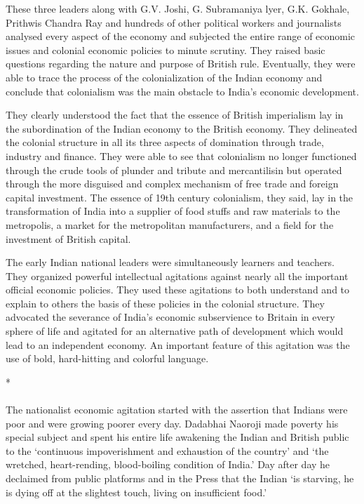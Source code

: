 \begin{multicols}{2}
These three leaders along with G.V. Joshi, G. Subramaniya lyer, G.K. Gokhale, Prithwis Chandra Ray and hundreds of other political workers and journalists analysed every aspect of the economy and subjected the entire range of economic issues and colonial economic policies to minute scrutiny. They raised basic questions regarding the nature and purpose of British rule. Eventually, they were able to trace the process of the colonialization of the Indian economy and conclude that colonialism was the main obstacle to India's economic development.

They clearly understood the fact that the essence of British imperialism lay in the subordination of the Indian economy to the British economy. They delineated the colonial structure in all its three aspects of domination through trade, industry and finance. They were able to see that colonialism no longer functioned through the crude tools of plunder and tribute and mercantilisin but operated through the more disguised and complex mechanism of free trade and foreign capital investment. The essence of 19th century colonialism, they said, lay in the transformation of India into a supplier of food stuffs and raw materials to the metropolis, a market for the metropolitan manufacturers, and a field for the investment of British capital.

The early Indian national leaders were simultaneously learners and teachers. They organized powerful intellectual agitations against nearly all the important official economic policies. They used these agitations to both understand and to explain to others the basis of these policies in the colonial structure. They advocated the severance of India's economic subservience to Britain in every sphere of life and agitated for an alternative path of development which would lead to an independent economy. An important feature of this agitation was the use of bold, hard-hitting and colorful language.

\begin{center}*\end{center}

\paragraph*{}

The nationalist economic agitation started with the assertion that Indians were poor and were growing poorer every day. Dadabhai Naoroji made poverty his special subject and spent his entire life awakening the Indian and British public to the `continuous impoverishment and exhaustion of the country' and `the wretched, heart-rending, blood-boiling condition of India.' Day after day he declaimed from public platforms and in the Press that the Indian `is starving, he is dying off at the slightest touch, living on insufficient food.'


\end{multicols}

